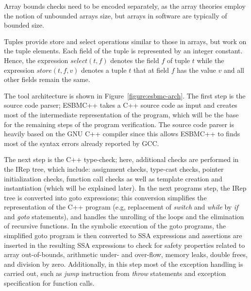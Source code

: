 \documentclass[conference]{IEEEtran}
\begin{document}
\noindent
Array bounds checks need to be encoded separately, as the array theories
employ the notion of unbounded arrays size, but arrays in software are
typically of bounded size.


Tuples %
provide
\mbox{store} and \mbox{select} operations similar to those in arrays, but work
on the tuple \mbox{elements}. Each field of the tuple is represented by an
integer constant. Hence, the expression $\mathit{select}(t, f)$ denotes the field $f$
of tuple $t$ while the expression $\mathit{store}(t, f, v)$ denotes a tuple $t$
that at field $f$ has the value $v$ and all other fields remain the
same.

\smallskip{}
%
The tool architecture is shown in Figure~\ref{figure:esbmc-arch}. The first step
is the source code parser; ESBMC++ takes a C++ source code as input and creates
most of the intermediate representation of the program, which will be the base
for the remaining steps of the program verification. The source code parser is
heavily based on the GNU C++ compiler since this allows ESBMC++ to finds most of the
syntax errors already reported by GCC.

The next step is the C++ type-check; here, additional checks are performed in the IRep
tree, which include: assignment checks, type-cast checks, pointer initialization checks, function
call checks as well as template creation and instantiation (which will be explained later).
In the next programs step, the IRep tree is converted into goto expressions; this conversion
simplifies the representation of the C++ program (e.g, replacement of \emph{switch} and \emph{while}
by \emph{if} and \emph{goto} statements), and handles the unrolling of the loops and the
elimination of recursive functions. In the symbolic execution of the goto programs, the simplified goto program
is then converted to SSA expressions and assertions are inserted in the resulting SSA
expressions to check for safety properties related to array out-of-bounds, arithmetic under-
and over-flow, memory leaks, double frees, and division by zero.
Additionally, in this step most of the exception handling is carried out, such as \textit{jump} instruction
from \textit{throw} statements and exception specification for function calls.
\end{document}
